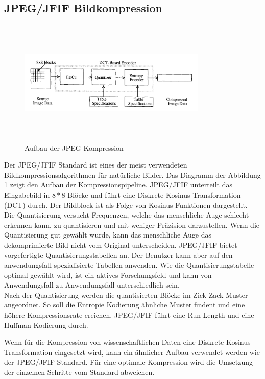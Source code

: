 \subsection{JPEG/JFIF Bildkompression}
\begin{figure}[!htbp]
	\center
	\includegraphics[width=0.8\textwidth,height=6cm,keepaspectratio]{./pictures/state/jpeg.png}
	\caption{Aufbau der JPEG Kompression \cite{wallace1992jpeg}}
	\label{state:jpeg:abb}
\end{figure}
Der JPEG/JFIF Standard\cite{wallace1992jpeg} ist eines der meist verwendeten Bildkompressionsalgorithmen für natürliche Bilder. Das Diagramm der Abbildung \ref{state:jpeg:abb} zeigt den Aufbau der Kompressionspipeline. JPEG/JFIF unterteilt das Eingabebild in $8*8$ Blöcke und führt eine Diskrete Kosinus Transformation (DCT) durch. Der Bildblock ist als Folge von Kosinus Funktionen dargestellt.\\
Die Quantisierung versucht Frequenzen, welche das menschliche Auge schlecht erkennen kann, zu quantisieren und mit weniger Präzision darzustellen. Wenn die Quantisierung gut gewählt wurde, kann das menschliche Auge das dekomprimierte Bild nicht vom Original unterscheiden. JPEG/JFIF bietet vorgefertigte Quantisierungstabellen an. Der Benutzer kann aber auf den anwendungsfall spezialisierte Tabellen anwenden. Wie die Quantisierungstabelle optimal gewählt wird, ist ein aktives Forschungsfeld \cite{wu1993rate:jpeg} \cite{wang2001designing:jpeg} und kann von Anwendungsfall zu Anwendungsfall unterschiedlich sein.\\
Nach der Quantisierung werden die quantisierten Blöcke im Zick-Zack-Muster\cite{wallace1992jpeg} angeordnet. So soll die Entropie Kodierung ähnliche Muster findent und eine höhere Kompressionsrate ereichen. JPEG/JFIF führt eine Run-Length\cite{wiki:rle} und eine Huffman-Kodierung\cite{huffman1952method} durch.

Wenn für die Kompression von wissenschaftlichen Daten eine Diskrete Kosinus Transformation eingesetzt wird, kann ein ähnlicher Aufbau verwendet werden wie der JPEG/JFIF Standard. Für eine optimale Kompression wird die Umsetzung der einzelnen Schritte vom Standard abweichen.

